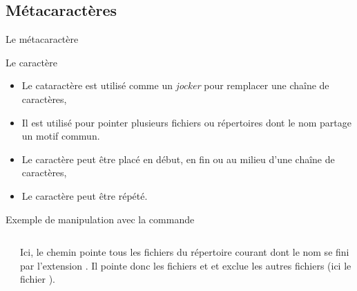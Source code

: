 \subsection{Métacaractères}
\begin{frame}{Le métacaractère \lin{*}}
  \begin{block}{Le caractère \lin{*}}
    \begin{itemize}
    \item Le cataractère \lin{*} est utilisé comme un \textit{jocker}
      pour remplacer une chaîne de caractères,
    \item Il est utilisé pour pointer plusieurs fichiers ou répertoires
      dont le nom partage un motif commun.
    \item Le caractère \lin{*} peut être placé en début, en fin ou au
      milieu d'une chaîne de caractères,
    \item Le caractère \lin{*} peut être répété.
    \end{itemize}
  \end{block}
  \begin{block}{Exemple de manipulation avec la commande }
    \scriptsize{
      \begin{columns}
        \begin{column}{6cm}
          \begin{center}
          \end{center}
        \end{column}
        \begin{column}{6cm}
          Ici, le chemin  pointe tous les fichiers du
          répertoire courant dont le nom se fini par l'extension
          . Il pointe donc les fichiers 
          et  et exclue les autres fichiers (ici le
          fichier ).
        \end{column}
      \end{columns}
      \begin{columns}
        \begin{column}{6cm}
\end{column}
\end{columns}}
\end{block}
\end{frame}

